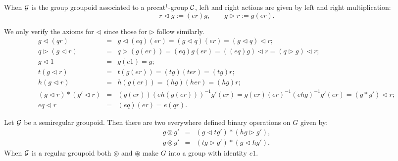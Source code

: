 \begin{lem}
When $\mathcal{G}$ is the group groupoid associated to a precat$^1$-group $\mathcal{C}$, 
left and right actions are given by left and right multiplication:
$$
r \lhd g := (er)g, \qquad  g \rhd r := g(er).
$$
\end{lem}
\begin{pf}
We only verify the axioms for $\lhd$ since those for $\rhd$ follow similarly. 
\begin{eqnarray*}
g \lhd (qr) &=& g \lhd (eq)(er) = (g \lhd q)(er) = (g \lhd q) \lhd r; \\ 
q \rhd (g \lhd r) &=& q \rhd (g(er)) = (eq)g(er) 
                   =  ((eq)g) \lhd r = (q \rhd g) \lhd r; \\
g \lhd 1 &=& g(e1) = g; \\
t(g \lhd r) &=& t(g(er)) = (tg)(ter) = (tg)r; \\
h(g \lhd r) &=& h(g(er)) = (hg)(her) = (hg)r; \\
(g \lhd r)*(g' \lhd r) &=& (g(er))(eh(g(er)))^{-1}g'(er) 
     = g(er)(er)^{-1}(ehg)^{-1}g'(er) = (g*g') \lhd r; \\
eq \lhd r &=& (eq)(er) = e(qr). 
\end{eqnarray*}
\end{pf}

\begin{prop} 
Let $\mathcal{G}$ be a semiregular groupoid. 
Then there are two everywhere defined binary operations on $G$ given by: 
\begin{eqnarray*}
g \circledcirc g' &=& (g \lhd tg') * (hg \rhd g'), \\ 
g \circledast g' &=& (tg \rhd g') * (g \lhd hg'). 
\end{eqnarray*} 
When $\mathcal{G}$ is a regular groupoid both $\circledcirc$ and $\circledast$ 
make $G$ into a group with identity $e1$. 
\end{prop} 

